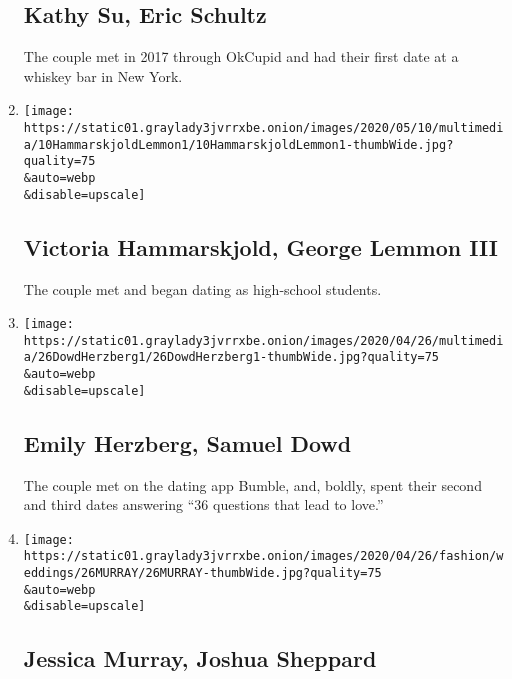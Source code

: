 \begin{enumerate}
{  \subsection{Kathy Su, Eric Schultz}\label{kathy-su-eric-schultz}}

  The couple met in 2017 through OkCupid and had their first date at a
  whiskey bar in New York.
\item
  \href{/2020/05/10/fashion/weddings/victoria-hammarskjold-george-lemmon-iii.html}{}

  \texttt{[image: https://static01.graylady3jvrrxbe.onion/images/2020/05/10/multimedia/10HammarskjoldLemmon1/10HammarskjoldLemmon1-thumbWide.jpg?quality=75\\\&auto=webp\\\&disable=upscale]}

  \hypertarget{victoria-hammarskjold-george-lemmon-iii}{%
  \subsection{Victoria Hammarskjold, George Lemmon
  III}\label{victoria-hammarskjold-george-lemmon-iii}}

  The couple met and began dating as high-school students.
\item
  \href{/2020/04/26/fashion/weddings/emily-herzberg-samuel-dowd.html}{}

  \texttt{[image: https://static01.graylady3jvrrxbe.onion/images/2020/04/26/multimedia/26DowdHerzberg1/26DowdHerzberg1-thumbWide.jpg?quality=75\\\&auto=webp\\\&disable=upscale]}

  \hypertarget{emily-herzberg-samuel-dowd}{%
  \subsection{Emily Herzberg, Samuel
  Dowd}\label{emily-herzberg-samuel-dowd}}

  The couple met on the dating app Bumble, and, boldly, spent their
  second and third dates answering ``36 questions that lead to love.''
\item
  \href{/2020/04/26/fashion/weddings/jessica-murray-joshua-sheppard.html}{}

  \texttt{[image: https://static01.graylady3jvrrxbe.onion/images/2020/04/26/fashion/weddings/26MURRAY/26MURRAY-thumbWide.jpg?quality=75\\\&auto=webp\\\&disable=upscale]}

  \hypertarget{jessica-murray-joshua-sheppard}{%
  \subsection{Jessica Murray, Joshua
  Sheppard}\label{jessica-murray-joshua-sheppard}}


\end{enumerate}
